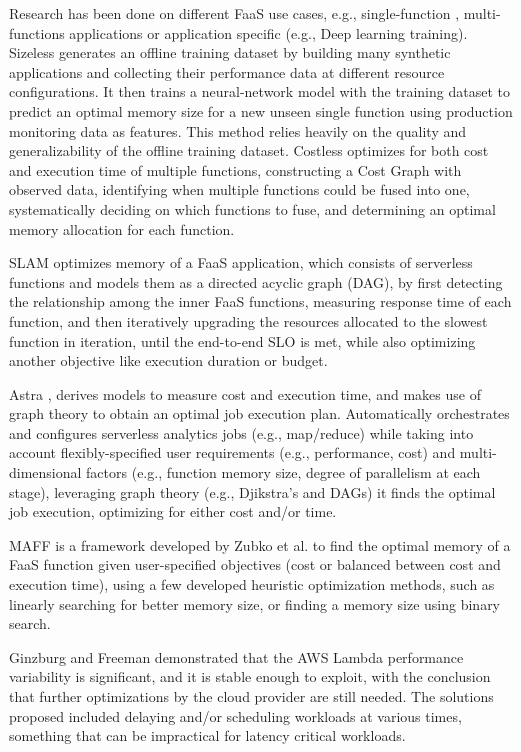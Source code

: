 \documentclass[conference]{IEEEtran}
\begin{document}
Research has been done on different FaaS use cases, e.g., single-function \cite{10.1145/3429880.3430099, 9946331, 9881584}, multi-functions applications \cite{s23187829, 8567674} or application specific \cite{9826021} (e.g., Deep learning training). Sizeless \cite{10.1145/3464298.3493398} generates an offline training dataset by building many synthetic applications and collecting their performance data at different resource configurations. It then trains a neural-network model with the training dataset to predict an optimal memory size for a new unseen single function using production monitoring data as features. This method relies heavily on the quality and generalizability of the offline training dataset. Costless \cite {8567674} optimizes for both cost and execution time of multiple functions, constructing a Cost Graph with observed data, identifying when multiple functions could be fused into one, systematically deciding on which functions to fuse, and determining an optimal memory allocation for each function.

SLAM \cite{9860980} optimizes memory of a FaaS application, which consists of serverless functions and models them as a directed acyclic graph (DAG), by first detecting the relationship among the inner FaaS functions, measuring response time of each function, and then iteratively upgrading the resources allocated to the slowest function in iteration, until the end-to-end SLO is met, while also optimizing another objective like execution duration or budget.

Astra \cite{9460548}, derives models to measure cost and execution time, and makes use of graph theory to obtain an optimal job execution plan. Automatically orchestrates and configures serverless analytics jobs (e.g., map/reduce) while taking into account flexibly-specified user requirements (e.g., performance, cost) and multi-dimensional factors (e.g., function memory size, degree of parallelism at each stage), leveraging graph theory (e.g., Djikstra's and DAGs) it finds the optimal job execution, optimizing for either cost and/or time.

MAFF\cite{10.1007/978-3-031-04718-3_9} is a framework developed by Zubko et al. to find the optimal memory of a FaaS function given user-specified objectives (cost or balanced between cost and execution time), using a few developed heuristic optimization methods, such as linearly searching for better memory size, or finding a memory size using binary search.

Ginzburg and Freeman \cite{10.1145/3429880.3430099} demonstrated that the AWS Lambda performance variability is significant, and it is stable enough to exploit, with the conclusion that further optimizations by the cloud provider are still needed. The solutions proposed included delaying and/or scheduling workloads at various times, something that can be impractical for latency critical workloads.
\end{document}
